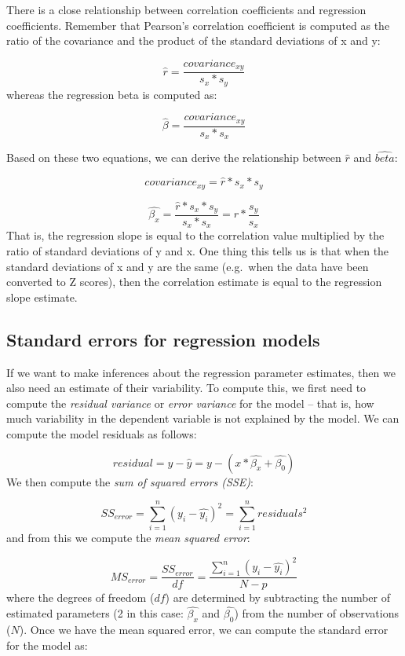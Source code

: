 \documentclass[]{book}
\theoremstyle{definition}
\theoremstyle{definition}
\theoremstyle{definition}
\theoremstyle{remark}
\begin{document}
There is a close relationship between correlation coefficients and
regression coefficients. Remember that Pearson's correlation coefficient
is computed as the ratio of the covariance and the product of the
standard deviations of x and y:

\[
\hat{r} = \frac{covariance_{xy}}{s_x * s_y}
\] whereas the regression beta is computed as:

\[
\hat{\beta} = \frac{covariance_{xy}}{s_x*s_x}
\]

Based on these two equations, we can derive the relationship between
\(\hat{r}\) and \(\hat{beta}\):

\[
covariance_{xy} = \hat{r} * s_x * s_y
\]

\[
\hat{\beta_x} =  \frac{\hat{r} * s_x * s_y}{s_x * s_x} = r * \frac{s_y}{s_x}
\] That is, the regression slope is equal to the correlation value
multiplied by the ratio of standard deviations of y and x. One thing
this tells us is that when the standard deviations of x and y are the
same (e.g.~when the data have been converted to Z scores), then the
correlation estimate is equal to the regression slope estimate.

\subsection{Standard errors for regression
models}\label{standard-errors-for-regression-models}

If we want to make inferences about the regression parameter estimates,
then we also need an estimate of their variability. To compute this, we
first need to compute the \emph{residual variance} or \emph{error
variance} for the model -- that is, how much variability in the
dependent variable is not explained by the model. We can compute the
model residuals as follows:

\[
residual = y - \hat{y} = y - (x*\hat{\beta_x} + \hat{\beta_0})
\] We then compute the \emph{sum of squared errors (SSE)}:

\[
SS_{error} = \sum_{i=1}^n{(y_i - \hat{y_i})^2} = \sum_{i=1}^n{residuals^2}
\] and from this we compute the \emph{mean squared error}:

\[
MS_{error} = \frac{SS_{error}}{df} = \frac{\sum_{i=1}^n{(y_i - \hat{y_i})^2} }{N - p}
\] where the degrees of freedom (\(df\)) are determined by subtracting
the number of estimated parameters (2 in this case: \(\hat{\beta_x}\)
and \(\hat{\beta_0}\)) from the number of observations (\(N\)). Once we
have the mean squared error, we can compute the standard error for the
model as:
\end{document}
